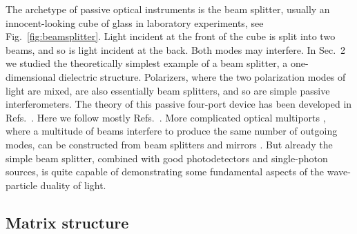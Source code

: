 \documentclass[12pt,amsmath,amssymb]{article}
\numberwithin{equation}{section}
\begin{document}
The archetype of passive optical instruments is the beam
splitter, usually an innocent-looking cube of glass in laboratory
experiments, see Fig.\ \ref{fig:beamsplitter}.
Light incident at the front of the cube is split into
two beams, and so is light incident at the back. Both modes may
interfere. In Sec.\ 2 we studied the theoretically simplest
example of a beam splitter, a one-dimensional dielectric
structure. Polarizers, where the two polarization modes of light
are mixed, are also essentially beam splitters,
and so are simple passive interferometers.
The theory of this passive four-port device has been developed in Refs.\
\cite{Allen,Aharonov,Brunner,Campos,Huttner,Janszky1,Janszky2,Janszky3,Lai,LeoSU2,Luis,OHM,PaulSplitter,PaulReview,Perinova,Prasad,vanderPlank,Zeilinger}.
Here we follow mostly Refs.\ \cite{Campos,LeoSU2}.
More complicated
optical multiports \cite{Reck,Torma1,Torma3}, where a multitude
of beams interfere to produce the same number of outgoing modes,
can be constructed from beam splitters and mirrors \cite{Reck}.
But already the simple beam splitter, combined with good
photodetectors and single-photon sources, is quite capable of
demonstrating some fundamental aspects of the wave-particle
duality of light.

\subsection{Matrix structure}
\end{document}
